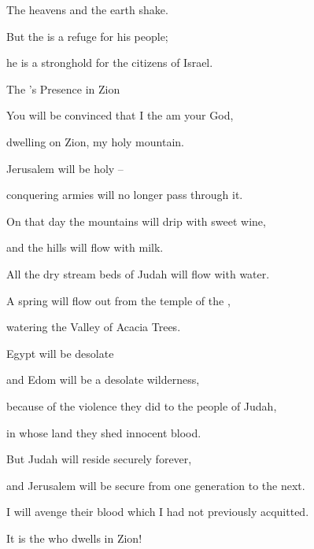 {\par }{\Q The heavens
and the earth
shake.
\par }{\Q But the
{}
is a refuge
for his people;
\par }{\Q he is a stronghold
for the citizens of Israel.
\par }{\SH The
{}’s Presence in Zion
\par }{\Q {}You will be convinced
that
I
the {}
am your God,
\par }{\Q dwelling
on Zion,
my holy
mountain.
\par }{\Q Jerusalem
will be
holy
–
\par }{\Q conquering
armies will no
longer
pass through it.
\par }{\Q {}On that
day
the mountains
will drip
with sweet wine,
\par }{\Q and the hills
will flow
with milk.
\par }{\Q All
the dry stream beds
of Judah
will flow
with water.
\par }{\Q A spring
will flow out
from the temple
of the {},
\par }{\Q watering
the Valley
of Acacia Trees.
\par }{\Q {}Egypt
will be desolate
\par }{\Q and Edom
will be a desolate
wilderness,
\par }{\Q because of the violence
they did to the people of Judah,
\par }{\Q in whose
land
they shed
innocent
blood.
\par }{\Q {}But Judah
will reside
securely forever,
\par }{\Q and Jerusalem
will be secure from one generation to the next.
\par }{\Q {}I will avenge
their blood
which I had not
previously acquitted.
\par }{\PP It is the
{}
who dwells
in Zion!
\par }